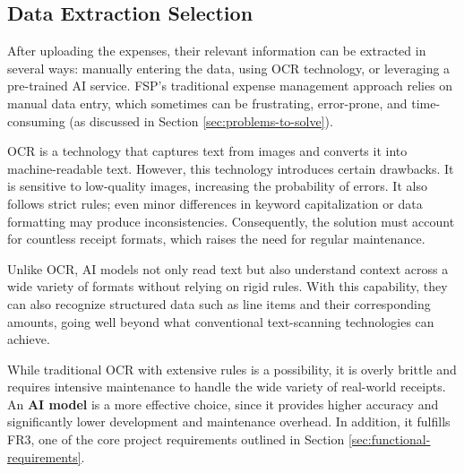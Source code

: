 
\vspace{0.2cm}
\subsection{Data Extraction Selection}

After uploading the expenses, their relevant information can be extracted in several ways: manually entering the data, using OCR technology, or leveraging a pre-trained AI service. FSP's traditional expense management approach relies on manual data entry, which sometimes can be frustrating, error-prone, and time-consuming (as discussed in Section \ref{sec:problems-to-solve}).

OCR is a technology that captures text from images and converts it into machine-readable text. However, this technology introduces certain drawbacks. It is sensitive to low-quality images, increasing the probability of errors. It also follows strict rules; even minor differences in keyword capitalization or data formatting may produce inconsistencies. Consequently, the solution must account for countless receipt formats, which raises the need for regular maintenance. 

Unlike OCR, AI models not only read text but also understand context across a wide variety of formats without relying on rigid rules. With this capability, they can also recognize structured data such as line items and their corresponding amounts, going well beyond what conventional text-scanning technologies can achieve.

\vspace{1cm}

While traditional OCR with extensive rules is a possibility, it is overly brittle and requires intensive maintenance to handle the wide variety of real-world receipts. An \textbf{AI model} is a more effective choice, since it provides higher accuracy and significantly lower development and maintenance overhead. In addition, it fulfills FR3, one of the core project requirements outlined in Section \ref{sec:functional-requirements}.


